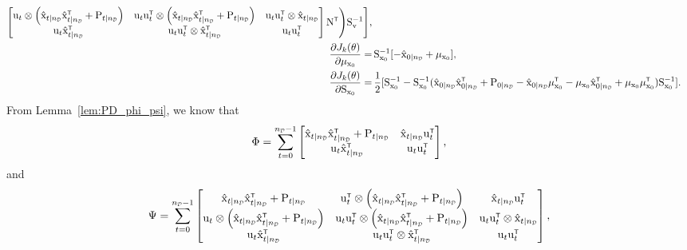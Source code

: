 \begin{align}
\begin{bmatrix}
        \vcu_t \otimes \left(\hat{\vcx}_{t|\nD} \hat{\vcx}_{t|\nD}^\tr +    \mxP_{t|\nD} \right)
        & \vcu_t \vcu_t^\tr \otimes \left(\hat{\vcx}_{t|\nD} \hat{\vcx}_{t|\nD}^\tr     + \mxP_{t|\nD} \right)
        & \vcu_t\vcu_t^\tr \otimes \hat{\vcx}_{t|\nD}\\
        \vcu_t \hat{\vcx}_{t|\nD}^\tr 
        & \vcu_t \vcu_t^\tr \otimes \hat{\vcx}_{t|\nD}^\tr
        & \vcu_t \vcu_t^\tr 
        \end{bmatrix}
        \mxN^\tr \Bigg) \mxS_\vcv^{-1} \Bigg], \\
        \pdv{J_k(\vctheta)}{\vcmu_{\vcx_0}} =& \, \mxS_{\vcx_0}^{-1} [-\hat{\vcx}_{0|\nD}+\vcmu_{\vcx_0}],\\
        \pdv{J_k(\vctheta)}{\mxS_{\vcx_0}} =& \, \frac{1}{2}  [\mxS_{\vcx_0}^{-1} - \mxS_{\vcx_0}^{-1} (\hat{\vcx}_{0|\nD}\hat{\vcx}_{0|\nD}^\tr + \mxP_{0|\nD} - \hat{\vcx}_{0|\nD}\vcmu_{\vcx_0}^\tr - \vcmu_{\vcx_0}\hat{\vcx}_{0|\nD}^\tr + \vcmu_{\vcx_0}\vcmu_{\vcx_0}^\tr) \mxS_{\vcx_0}^{-1}]. 
\end{align}
From Lemma~\ref{lem:PD_phi_psi}, we know that
\begin{equation}
    \Phi = \sum_{t=0}^{\nD-1}\begin{bmatrix}\hat{\vcx}_{t|\nD}\hat{\vcx}_{t|\nD}^\tr + \mxP_{t|\nD}  &\hat{\vcx}_{t|\nD}\vcu_t^\tr \\\vcu_t\hat{\vcx}_{t|\nD}^\tr &\vcu_t \vcu_t^\tr \end{bmatrix},
\end{equation}
and
\begin{equation}
    \Psi =\sum_{t=0}^{\nD-1}\begin{bmatrix} 
        \hat{\vcx}_{t|\nD} \hat{\vcx}_{t|\nD}^\tr + \mxP_{t|\nD} 
        & \vcu_t^\tr \otimes \left(\hat{\vcx}_{t|\nD} \hat{\vcx}_{t|\nD}^\tr + \mxP_{t|\nD} \right) 
        & \hat{\vcx}_{t|\nD} \vcu_t^\tr \\ 
        \vcu_t \otimes \left(\hat{\vcx}_{t|\nD} \hat{\vcx}_{t|\nD}^\tr +    \mxP_{t|\nD} \right)
        & \vcu_t \vcu_t^\tr \otimes \left(\hat{\vcx}_{t|\nD} \hat{\vcx}_{t|\nD}^\tr     + \mxP_{t|\nD} \right)
        & \vcu_t\vcu_t^\tr \otimes \hat{\vcx}_{t|\nD}\\
        \vcu_t \hat{\vcx}_{t|\nD}^\tr 
        & \vcu_t \vcu_t^\tr \otimes \hat{\vcx}_{t|\nD}^\tr
        & \vcu_t \vcu_t^\tr 
        \end{bmatrix},
\end{equation}
